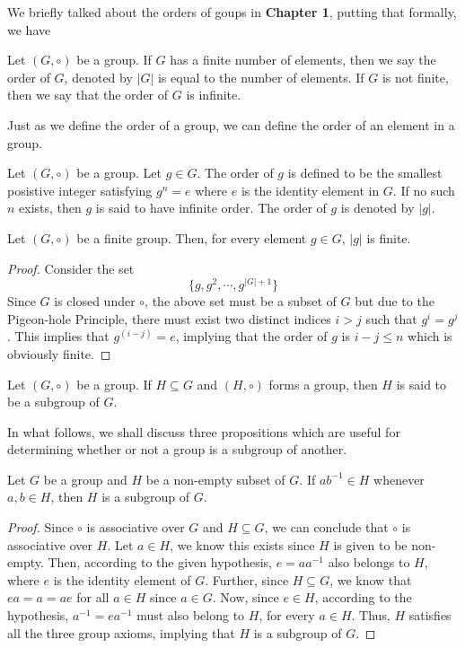 We briefly talked about the orders of goups in \textbf{Chapter 1}, putting that formally, we have 
\begin{definition}
	Let $(G,\circ)$ be a group. If $G$ has a finite number of elements, then we say the order of $G$, denoted by $|G|$ is equal to the number of elements. If $G$ is not finite, then we say that the order of $G$ is infinite.
\end{definition}

Just as we define the order of a group, we can define the order of an element in a group.
\begin{definition}
	Let $(G,\circ)$ be a group. Let $g\in G$. The order of $g$ is defined to be the smallest posistive integer satisfying $g^n=e$ where $e$ is the identity element in $G$. If no such $n$ exists, then $g$ is said to have infinite order. The order of $g$ is denoted by $|g|$.
\end{definition}

\begin{proposition}
	Let $(G,\circ)$ be a finite group. Then, for every element $g\in G$, $|g|$ is finite.
\end{proposition}
\begin{proof}
	Consider the set 
	$$
	\{g,g^2,\cdots,g^{|G|+1}\}
	$$
	Since $G$ is closed under $\circ$, the above set must be a subset of $G$ but due to the Pigeon-hole Principle, there must exist two distinct indices $i>j$ such that $g^i=g^j$. This implies that $g^{(i-j)}=e$, implying that the order of $g$ is $i-j\le n$ which is obviously finite.
\end{proof}

\begin{definition}[Subgroup]
	Let $(G,\circ)$ be a group. If $H\subseteq G$ and $(H,\circ)$ forms a group, then $H$ is said to be a subgroup of $G$.
\end{definition}

In what follows, we shall discuss three propositions which are useful for determining whether or not a group is a subgroup of another.

\begin{proposition}
	Let $G$ be a group and $H$ be a non-empty subset of $G$. If $ab^{-1}\in H$ whenever $a,b\in H$, then $H$ is a subgroup of $G$.
\end{proposition}
\begin{proof}
	Since $\circ$ is associative over $G$ and $H\subseteq G$, we can conclude that $\circ$ is associative over $H$. Let $a\in H$, we know this exists since $H$ is given to be non-empty. Then, according to the given hypothesis, $e=aa^{-1}$ also belongs to $H$, where $e$ is the identity element of $G$. Further, since $H\subseteq G$, we know that $ea=a=ae$ for all $a\in H$ since $a\in G$. Now, since $e\in H$, according to the hypothesis, $a^{-1}=ea^{-1}$ must also belong to $H$, for every $a\in H$. Thus, $H$ satisfies all the three group axioms, implying that $H$ is a subgroup of $G$.
\end{proof}

